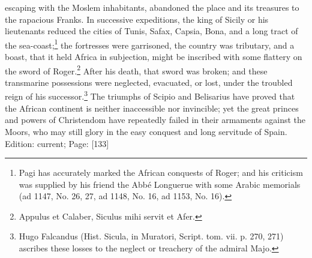 escaping with the Moslem inhabitants, abandoned the place and its treasures to the rapacious Franks. In successive expeditions, the king of Sicily or his lieutenants reduced the cities of Tunis, Safax, Capsia, Bona, and a long tract of the sea-coast;\footnote{Pagi has accurately marked the African conquests of Roger; and his criticism was supplied by his friend the Abbé Longuerue with some Arabic memorials (ad 1147, No. 26, 27, ad 1148, No. 16, ad 1153, No. 16).} the fortresses were garrisoned, the country was tributary, and a boast, that it held Africa in subjection, might be inscribed with some flattery on the sword of Roger.\footnote{Appulus et Calaber, Siculus mihi servit et Afer.} After his death, that sword was broken; and these transmarine possessions were neglected, evacuated, or lost, under the troubled reign of his successor.\footnote{Hugo Falcandus (Hist. Sicula, in Muratori, Script. tom. vii. p. 270, 271) ascribes these losses to the neglect or treachery of the admiral Majo.} The triumphs of Scipio and Belisarius have proved that the African continent is neither inaccessible nor invincible; yet the great princes and powers of Christendom have repeatedly failed in their armaments against the Moors, who may still glory in the easy conquest and long servitude of Spain.
Edition: current; Page: [133]

